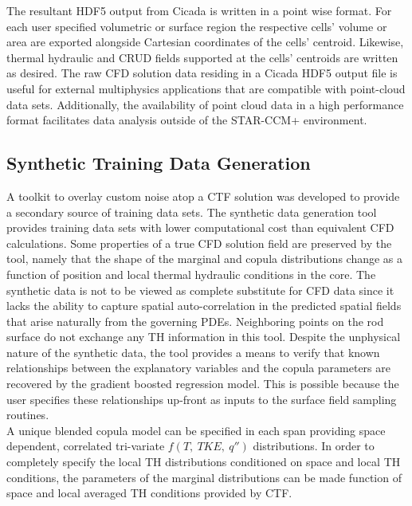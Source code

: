 The resultant HDF5 output from Cicada is written in a point wise format.  For each user specified volumetric or surface region the respective cells' volume or area are exported alongside Cartesian coordinates of the cells' centroid.  Likewise, thermal hydraulic and CRUD fields supported at the cells' centroids are written as desired.  The raw CFD solution data residing in a Cicada HDF5 output file is useful for external multiphysics applications that are compatible with point-cloud data sets.  Additionally, the availability of point cloud data in a high performance format facilitates data analysis outside of the STAR-CCM+ environment.  

\subsection{Synthetic Training Data Generation}

A toolkit to overlay custom noise atop a CTF solution was developed to provide a secondary source of training data sets.  The synthetic data generation tool provides training data sets with lower computational cost than equivalent CFD calculations.  Some properties of a true CFD solution field are preserved by the tool, namely that the shape of the marginal and copula distributions change as a function of position and local thermal hydraulic conditions in the core.  The synthetic data is not to be viewed as complete substitute for CFD data since it lacks the ability to capture spatial auto-correlation in the predicted spatial fields that arise naturally from the governing PDEs.  Neighboring points on the rod surface do not exchange any TH information in this tool.  Despite the unphysical nature of the synthetic data, the tool provides a means to verify that known relationships between the explanatory variables and the copula parameters are recovered by the gradient boosted regression model.  This is possible because the user specifies these relationships up-front as inputs to the surface field sampling routines. \\

A unique blended copula model can be specified in each span providing space dependent, correlated tri-variate $f(T,\ TKE,\ q'')$  distributions.
In order to completely specify the local TH distributions conditioned on space and local TH conditions, the parameters of the marginal distributions can be made function of space and local averaged TH conditions provided by CTF.  


